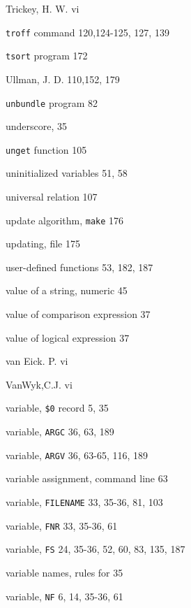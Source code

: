 \begin{multicols}{3}
\hangindent=3pc  Trickey, H. W. vi

\hangindent=3pc  \verb'troff' command 120,124-125, 127, 139

\hangindent=3pc  \verb'tsort' program 172





\hangindent=3pc  Ullman, J. D. 110,152, 179

\hangindent=3pc  \verb'unbundle' program 82

\hangindent=3pc  underscore, 35

\hangindent=3pc  \verb'unget' function 105

\hangindent=3pc  uninitialized variables 51, 58

\hangindent=3pc  universal relation 107

\hangindent=3pc  update algorithm, \verb'make' 176

\hangindent=3pc  updating, file 175

\hangindent=3pc  user-defined functions 53, 182,  187

\hangindent=3pc  value of a string, numeric 45

\hangindent=3pc  value of comparison expression 37

\hangindent=3pc  value of logical expression 37

\hangindent=3pc  van Eick. P. vi

\hangindent=3pc  VanWyk,C.J. vi

\hangindent=3pc  variable, \verb'$0' record 5, 35

\hangindent=3pc  variable, \verb'ARGC' 36, 63, 189

\hangindent=3pc  variable, \verb'ARGV' 36, 63-65, 116, 189

\hangindent=3pc  variable assignment, command line 63

\hangindent=3pc  variable, \verb'FILENAME' 33, 35-36, 81, 103

\hangindent=3pc  variable, \verb'FNR' 33, 35-36, 61

\hangindent=3pc  variable, \verb'FS' 24, 35-36, 52, 60, 83, 135, 187

\hangindent=3pc  variable names, rules for 35

\hangindent=3pc  variable, \verb'NF' 6, 14, 35-36, 61


\end{multicols}
